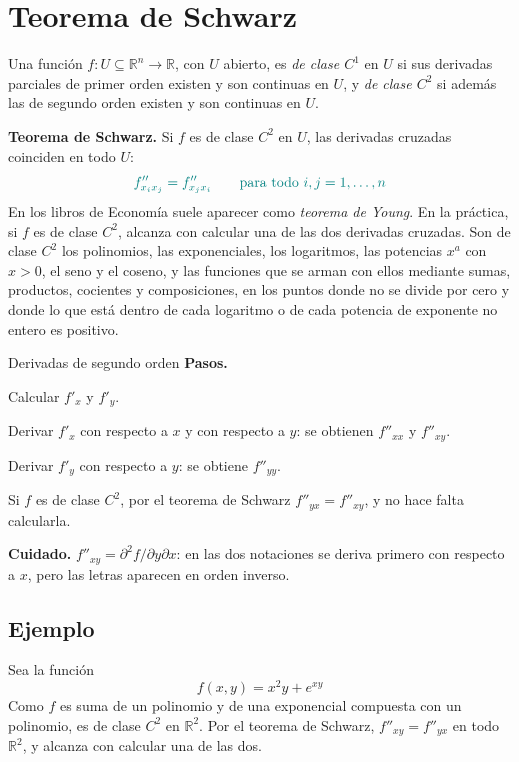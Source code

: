 \documentclass{article}
\newcommand{\rotulo}[2][principal]{\textsf{\bfseries\color{#1}#2}\enspace}
\begin{document}
\section*{Teorema de Schwarz}

Una función \(f\colon U\subseteq\mathbb{R}^n\to\mathbb{R}\), con \(U\) abierto, es \emph{de clase \(C^1\)} en \(U\) si sus derivadas parciales de primer orden existen y son continuas en \(U\), y \emph{de clase \(C^2\)} si además las de segundo orden existen y son continuas en \(U\).

\textbf{Teorema de Schwarz.} Si \(f\) es de clase \(C^2\) en \(U\), las derivadas cruzadas coinciden en todo \(U\):
\[
\color{teal}
f''_{x_ix_j}=f''_{x_jx_i}\qquad\text{para todo } i,j=1,\dots,n
\]
En los libros de Economía suele aparecer como \emph{teorema de Young}. En la práctica, si \(f\) es de clase \(C^2\), alcanza con calcular una de las dos derivadas cruzadas. Son de clase \(C^2\) los polinomios, las exponenciales, los logaritmos, las potencias \(x^a\) con \(x>0\), el seno y el coseno, y las funciones que se arman con ellos mediante sumas, productos, cocientes y composiciones, en los puntos donde no se divide por cero y donde lo que está dentro de cada logaritmo o de cada potencia de exponente no entero es positivo.

\begin{metodo}[label=met:segundo-orden]{Derivadas de segundo orden}
\rotulo{Pasos.}
\begin{pasos}
  \item Calcular \(f'_x\) y \(f'_y\).
  \item Derivar \(f'_x\) con respecto a \(x\) y con respecto a \(y\): se obtienen \(f''_{xx}\) y \(f''_{xy}\).
  \item Derivar \(f'_y\) con respecto a \(y\): se obtiene \(f''_{yy}\).
  \item Si \(f\) es de clase \(C^2\), por el teorema de Schwarz \(f''_{yx}=f''_{xy}\), y no hace falta calcularla.
\end{pasos}
\rotulo{Cuidado.} \(f''_{xy}=\partial^2 f/\partial y\partial x\): en las dos notaciones se deriva primero con respecto a \(x\), pero las letras aparecen en orden inverso.
\end{metodo}

\subsection*{Ejemplo}

Sea la función
\[
f(x,y)=x^{2}y + e^{xy}
\]
Como \(f\) es suma de un polinomio y de una exponencial compuesta con un polinomio, es de clase \(C^2\) en \(\mathbb{R}^2\). Por el teorema de Schwarz, \(f''_{xy}=f''_{yx}\) en todo \(\mathbb{R}^2\), y alcanza con calcular una de las dos.
\end{document}
